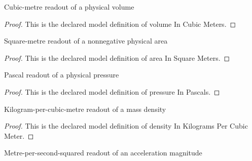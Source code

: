 \begin{definition}
  \label{def:physics:phyx-mini-0453:phyxminiproblems-problemphyxmini0453-volumeincubicmeters}
  Cubic-metre readout of a physical volume
\end{definition}
\begin{proof}
  This is the declared model definition of volume In Cubic Meters.
\end{proof}
\begin{definition}
  \label{def:physics:phyx-mini-0453:phyxminiproblems-problemphyxmini0453-areainsquaremeters}
  Square-metre readout of a nonnegative physical area
\end{definition}
\begin{proof}
  This is the declared model definition of area In Square Meters.
\end{proof}
\begin{definition}
  \label{def:physics:phyx-mini-0453:phyxminiproblems-problemphyxmini0453-pressureinpascals}
  Pascal readout of a physical pressure
\end{definition}
\begin{proof}
  This is the declared model definition of pressure In Pascals.
\end{proof}
\begin{definition}
  \label{def:physics:phyx-mini-0453:phyxminiproblems-problemphyxmini0453-densityinkilogramspercubicmeter}
  Kilogram-per-cubic-metre readout of a mass density
\end{definition}
\begin{proof}
  This is the declared model definition of density In Kilograms Per Cubic Meter.
\end{proof}
\begin{definition}
  \label{def:physics:phyx-mini-0453:phyxminiproblems-problemphyxmini0453-accelerationinmeterspersecondsquared}
  Metre-per-second-squared readout of an acceleration magnitude
\end{definition}
